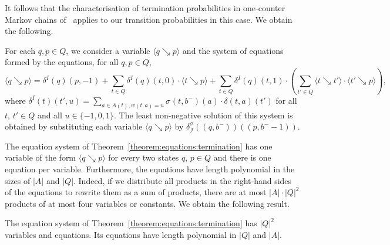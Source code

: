 \documentclass[a4paper,UKenglish,cleveref,autoref,thm-restate,colorlinks]{lipics-v2021}
\newcommand{\mdpTrans}{\delta}
\newcommand{\weight}{w}
\newcommand{\weightVal}{u}
\newcommand{\ocStateSpace}{Q}
\newcommand{\ocState}{q}
\newcommand{\ocStateB}{p}
\newcommand{\ocStateC}{t}
\newcommand{\ocActionSpace}{A}
\newcommand{\ocAction}{a}
\newcommand{\ocTrans}{\delta}
\newcommand{\intPart}{\mathcal{I}}
\newcommand{\interval}{I}
\newcommand{\intBound}{b}
\newcommand{\intLB}{\intBound^-}
\newcommand{\compressChainTransTemplate}[2]{\mdpTrans^{#1}_{#2}}
\newcommand{\compressChainTrans}{\compressChainTransTemplate{\strat}{\intPart}}
\newcommand{\termProbaVar}[2]{\langle#1\searrow{}#2\rangle}
\newcommand{\stratGeneric}[1]{{\sigma_{#1}}}
\newcommand{\strat}{\stratGeneric{}}
\begin{document}
It follows that the characterisation of termination probabilities in one-counter Markov chains of~\cite{DBLP:journals/lmcs/KuceraEM06} applies to our transition probabilities in this case.
We obtain the following.


\begin{theorem}\label{theorem:equations:termination}
  For each $\ocState, \ocStateB\in\ocStateSpace$, we consider a variable $\termProbaVar{\ocState}{\ocStateB}$ and the system of equations formed by the equations, for all $\ocState, \ocStateB\in\ocStateSpace$,
  \[\termProbaVar{\ocState}{\ocStateB} =
    \ocTrans^\interval(\ocState)(\ocStateB, -1) +
    \sum_{\ocStateC\in\ocStateSpace} \ocTrans^\interval(\ocState)(\ocStateC, 0)\cdot\termProbaVar{\ocStateC}{\ocStateB} +
    \sum_{\ocStateC\in\ocStateSpace} \ocTrans^\interval(\ocState)(\ocStateC, 1)\cdot
    \left(\sum_{\ocStateC'\in\ocStateSpace}\termProbaVar{\ocStateC}{\ocStateC'}\cdot\termProbaVar{\ocStateC'}{\ocStateB}\right),
  \]
  where $\ocTrans^\interval(\ocStateC)(\ocStateC', \weightVal) = \sum_{\ocAction\in\ocActionSpace(\ocStateC), \weight(\ocStateC, \ocAction)=\weightVal}\strat(\ocStateC, \intLB)(\ocAction)\cdot\ocTrans(\ocStateC, \ocAction)(\ocStateC')$ for all $\ocStateC$, $\ocStateC'\in\ocStateSpace$ and all $\weightVal\in\{-1, 0, 1\}$.
  The least non-negative solution of this system is obtained by substituting each variable $\termProbaVar{\ocState}{\ocStateB}$ by  $\compressChainTrans((\ocState, \intLB))((\ocStateB, \intLB-1))$.
\end{theorem}

The equation system of Theorem~\ref{theorem:equations:termination} has one variable of the form $\termProbaVar{\ocState}{\ocStateB}$ for every two states $\ocState$, $\ocStateB\in\ocStateSpace$ and there is one equation per variable.
Furthermore, the equations have length polynomial in the sizes of $|\ocActionSpace|$ and $|\ocStateSpace|$.
Indeed, if we distribute all products in the right-hand sides of the equations to rewrite them as a sum of products, there are at most $|\ocActionSpace|\cdot|\ocStateSpace|^2$ products of at most four variables or constants.
We obtain the following result.

\begin{lemma}\label{lemma:equations:termination:size}
  The equation system of Theorem~\ref{theorem:equations:termination} has $|\ocStateSpace|^2$ variables and equations.
  Its equations have length polynomial in $|\ocStateSpace|$ and $|\ocActionSpace|$.
\end{lemma}
\end{document}
